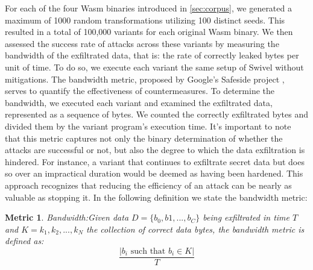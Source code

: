 \documentclass[sigplan,screen]{acmart}
\newcommand{\tool}{Wasm-mutate\xspace}
\newcommand{\wasm}{Wasm\xspace}
\newtheorem{metric}{Metric}
\begin{document}
For each of the four \wasm binaries introduced in \autoref{sec:corpus}, we generated a maximum of 1000 random transformations utilizing 100 distinct seeds. 
This resulted in a total of 100,000 variants for each original \wasm binary.
We then assessed the success rate of attacks across these variants by measuring the bandwidth of the exfiltrated data, that is: the rate of correctly leaked bytes per unit of time. 
To do so, we execute each variant the same setup of Swivel without mitigations.
The bandwidth metric, proposed by Google's Safeside project \cite{safeside}, serves to quantify the effectiveness of countermeasures.
To determine the bandwidth, we executed each variant and examined the exfiltrated data, represented as a sequence of bytes. 
We counted the correctly exfiltrated bytes and divided them by the variant program's execution time. 
It's important to note that this metric captures not only the binary determination of whether the attacks are successful or not, but also the degree to which the data exfiltration is hindered.
For instance, a variant that continues to exfiltrate secret data but does so over an impractical duration would be deemed as having been hardened. 
This approach recognizes that reducing the efficiency of an attack can be nearly as valuable as stopping it.
In the following definition we state the bandwidth metric:

\begin{metric}{Bandwidth:}\label{metric:ber}
Given data $D=\{b_0, b1, ..., b_C\}$ being exfiltrated in time $T$ and $K = {k_1, k_2, ..., k_N}$ the collection of correct data bytes, the bandwidth metric is defined as:
$$
    \frac{|b_i\text{ such that } b_i \in K|}{T}
$$
\end{metric}







 



\end{document}
